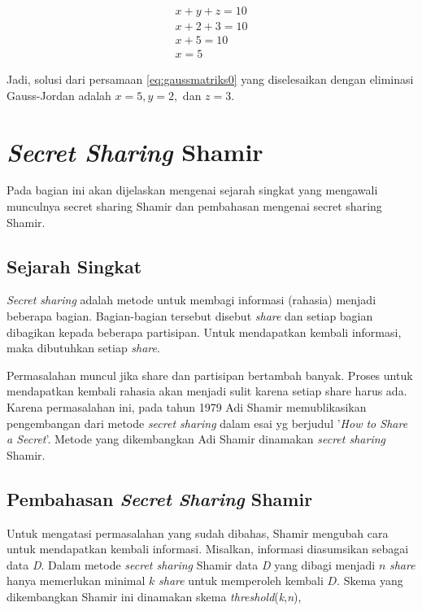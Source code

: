 \begin{gather}
	x + y + z = 10 \nonumber \\
	x + 2 + 3 = 10 \nonumber \\
	x + 5 = 10 \nonumber \\
	x = 5 \label{eq:gaussmatriks8}
\end{gather}

Jadi, solusi dari persamaan \ref{eq:gaussmatriks0} yang diselesaikan dengan eliminasi Gauss-Jordan adalah \begin{math}x=5, y=2,\end{math} dan \begin{math}z=3\end{math}.

\section{\textit{Secret Sharing} Shamir}\label{sec:secretsharingshamir}

Pada bagian ini akan dijelaskan mengenai sejarah singkat yang mengawali munculnya secret sharing Shamir dan pembahasan mengenai secret sharing Shamir.

\subsection{Sejarah Singkat}

\textit{Secret sharing} adalah metode untuk membagi informasi (rahasia) menjadi beberapa bagian. Bagian-bagian tersebut disebut \textit{share} dan setiap bagian dibagikan kepada beberapa partisipan. Untuk mendapatkan kembali informasi, maka dibutuhkan setiap \textit{share}.

Permasalahan muncul jika share dan partisipan bertambah banyak. Proses untuk mendapatkan kembali rahasia akan menjadi sulit karena setiap share harus ada. Karena permasalahan ini, pada tahun 1979 Adi Shamir memublikasikan pengembangan dari metode \textit{secret sharing} dalam esai yg berjudul '\textit{How to Share a Secret}'\cite{shamir1979share}. Metode yang dikembangkan Adi Shamir dinamakan \textit{secret sharing} Shamir.

\subsection{Pembahasan \textit{Secret Sharing} Shamir}

Untuk mengatasi permasalahan yang sudah dibahas, Shamir mengubah cara untuk mendapatkan kembali informasi. Misalkan, informasi diasumsikan sebagai data \textit{D}. Dalam metode \textit{secret sharing} Shamir data \textit{D} yang dibagi menjadi \begin{math}n\end{math} \textit{share} hanya memerlukan minimal \begin{math}k\end{math} \textit{share} untuk memperoleh kembali \begin{math}D\end{math}. Skema yang dikembangkan Shamir ini dinamakan skema \textit{threshold}(\textit{k},\textit{n}),

